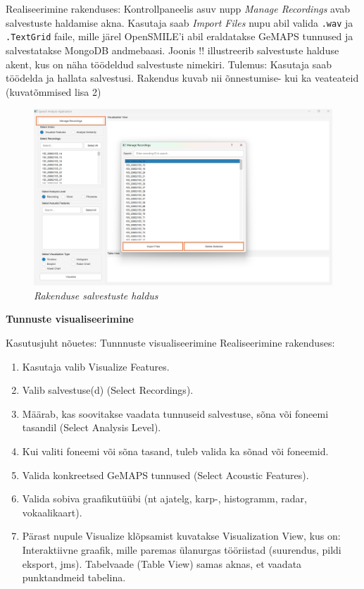 Realiseerimine rakenduses: Kontrollpaneelis asuv nupp \textit{Manage Recordings} avab salvestuste haldamise akna. Kasutaja saab \textit{Import Files} nupu abil valida \texttt{.wav} ja \texttt{.TextGrid} faile, mille järel OpenSMILE’i abil eraldatakse GeMAPS tunnused ja salvestatakse MongoDB andmebaasi. Joonis !! illustreerib salvestuste halduse akent, kus on näha töödeldud salvestuste nimekiri.
Tulemus: Kasutaja saab töödelda ja hallata salvestusi. Rakendus kuvab nii õnnestumise- kui ka veateateid (kuvatõmmised lisa 2)
\begin{figure}[H]
    \centering
    \includegraphics[width=\textwidth]{figures/rakenduse-salvestuste-haldus.png}
    \caption{\textit{Rakenduse salvestuste haldus}}
    \label{fig:rakenduse-salvestuste-haldus}
\end{figure}

\textbf{Tunnuste visualiseerimine
}

Kasutusjuht nõuetes: Tunnnuste visualiseerimine
Realiseerimine rakenduses:
\begin{enumerate}
    \item Kasutaja valib Visualize Features.
    \item Valib salvestuse(d) (Select Recordings).
    \item Määrab, kas soovitakse vaadata tunnuseid salvestuse, sõna või foneemi tasandil (Select Analysis Level).
    \item Kui valiti foneemi või sõna tasand, tuleb valida ka sõnad või foneemid.
    \item Valida konkreetsed GeMAPS tunnused (Select Acoustic Features).
    \item Valida sobiva graafikutüübi (nt ajatelg, karp-, histogramm, radar, vokaalikaart).
    \item Pärast nupule Visualize klõpsamist kuvatakse Visualization View, kus on: Interaktiivne graafik, mille paremas ülanurgas tööriistad (suurendus, pildi eksport, jms). Tabelvaade (Table View) samas aknas, et vaadata punktandmeid tabelina.
\end{enumerate}

